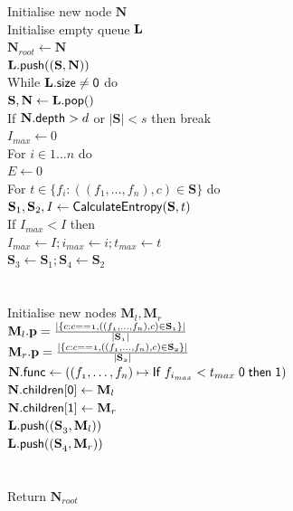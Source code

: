 \begin{figure}[h]
{		
		Initialise new node $\textbf{N}$\\
		Initialise empty queue $\bf{L}$\\
		$\textbf{N}_{root}\gets\textbf{N}$\\
		$\textbf{L}.\sf{push}((\textbf{S},\textbf{N}))$\\
		While $\textbf{L}.\sf{size}\neq0$ do\\
		\ind $\textbf{S}, \textbf{N}\gets \textbf{L}.\sf{pop}()$ \\
		\ind If $\textbf{N}.\sf{depth} > \mathnormal{d}$ or $|\textbf{S}|<s$ then break \\
		\ind $I_{max}\gets0$ \\
		\ind For $i\in1\dots n$ do \\
		\ind \ind $E\gets 0$ \\
		\ind \ind For $t\in \{f_i : ((f_1,\dots,f_n),c)\in \textbf{S}\}$ do \\
		\ind \ind \ind $\textbf{S}_1,\textbf{S}_2,I\gets\sf{CalculateEntropy}\mathnormal{(\textbf{S}, t)}$ \\
		\ind \ind \ind If $I_{max} < I$ then \\
		\ind \ind \ind \ind $I_{max}\gets I; i_{max}\gets i; t_{max}\gets t$ \\
		\ind \ind \ind \ind $\textbf{S}_3\gets \textbf{S}_1; \textbf{S}_4\gets \textbf{S}_2$ \\
		\ind \ind \color{gray}{End if} \\
		\ind \color{gray}{End for} \\
		\color{black}
		\ind Initialise new nodes $\textbf{M}_l, \textbf{M}_r$ \\
		\ind $\textbf{M}_l.\sf{\textbf{p}}=\mathnormal{\frac{|\{c : c == 1,((f_1,\dots,f_n),c)\in \textbf{S}_1\}|}{|\textbf{S}_1|}}$\\
		\ind $\textbf{M}_r.\sf{\textbf{p}}=\mathnormal{\frac{|\{c : c == 1,((f_1,\dots,f_n),c)\in \textbf{S}_2\}|}{|\textbf{S}_2|}}$\\
		\ind $\textbf{N}.\sf{func}\gets\mathnormal{((f_1,\dots,f_n)}\mapsto \sf{If}\;\mathnormal{f_{i_{max}}<t_{max}}\;0\;\sf{then}\;1)$\\
		\ind $\textbf{N}.\sf{children}[0]\gets\mathnormal{\textbf{M}_l}$ \\
		\ind $\textbf{N}.\sf{children}[1]\gets\mathnormal{\textbf{M}_r}$ \\
		\ind $\textbf{L}.\sf{push}\mathnormal{((\textbf{S}_3,\textbf{M}_l))}$\\
		\ind $\textbf{L}.\sf{push}\mathnormal{((\textbf{S}_4,\textbf{M}_r))}$\\
		\ind \color{gray}{End for} \\
		\color{gray}{End while}\\
		\color{black}Return $\textbf{N}_{root}$\\ \\
		
}
\end{figure}
